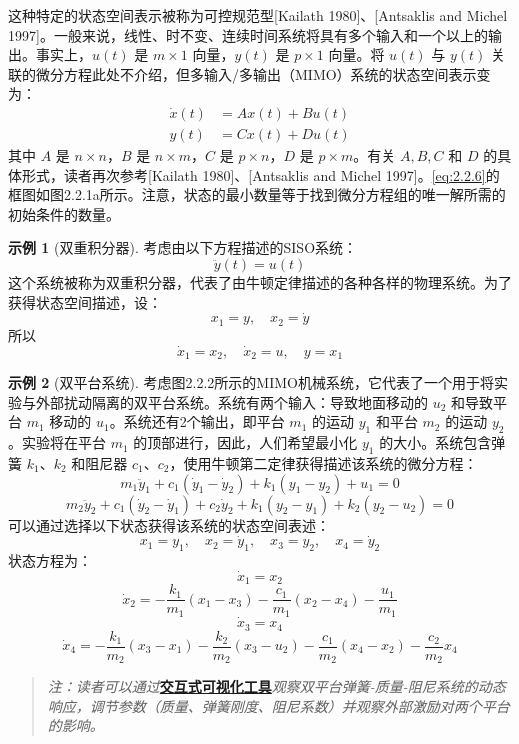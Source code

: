 \documentclass[UTF8,12pt,a4paper]{ctexart}
\theoremstyle{definition}
\newtheorem{example}{示例}[section]
\begin{document}
这种特定的状态空间表示被称为可控规范型[Kailath 1980]、[Antsaklis and Michel 1997]。一般来说，线性、时不变、连续时间系统将具有多个输入和一个以上的输出。事实上，$u(t)$ 是 $m \times 1$ 向量，$y(t)$ 是 $p \times 1$ 向量。将 $u(t)$ 与 $y(t)$ 关联的微分方程此处不介绍，但多输入/多输出（MIMO）系统的状态空间表示变为：
\begin{equation}\label{eq:2.2.6}
\begin{aligned}
\dot{x}(t) &= Ax(t) + Bu(t) \\
y(t) &= Cx(t) + Du(t)
\end{aligned}
\end{equation}
其中 $A$ 是 $n \times n$，$B$ 是 $n \times m$，$C$ 是 $p \times n$，$D$ 是 $p \times m$。有关 $A, B, C$ 和 $D$ 的具体形式，读者再次参考[Kailath 1980]、[Antsaklis and Michel 1997]。\eqref{eq:2.2.6}的框图如图2.2.1a所示。注意，状态的最小数量等于找到微分方程组的唯一解所需的初始条件的数量。

\begin{example}[双重积分器]
考虑由以下方程描述的SISO系统：
\[
\ddot{y}(t) = u(t)
\]
这个系统被称为双重积分器，代表了由牛顿定律描述的各种各样的物理系统。为了获得状态空间描述，设：
\[
x_1 = y, \quad x_2 = \dot{y}
\]
所以
\[
\dot{x}_1 = x_2, \quad \dot{x}_2 = u, \quad y = x_1
\]
\end{example}

\begin{example}[双平台系统]
考虑图2.2.2所示的MIMO机械系统，它代表了一个用于将实验与外部扰动隔离的双平台系统。系统有两个输入：导致地面移动的 $u_2$ 和导致平台 $m_1$ 移动的 $u_1$。系统还有2个输出，即平台 $m_1$ 的运动 $y_1$ 和平台 $m_2$ 的运动 $y_2$。实验将在平台 $m_1$ 的顶部进行，因此，人们希望最小化 $y_1$ 的大小。系统包含弹簧 $k_1$、$k_2$ 和阻尼器 $c_1$、$c_2$，使用牛顿第二定律获得描述该系统的微分方程：
\[
m_1 \ddot{y}_1 + c_1(\dot{y}_1 - \dot{y}_2) + k_1(y_1 - y_2) + u_1 = 0
\]
\[
m_2 \ddot{y}_2 + c_1(\dot{y}_2 - \dot{y}_1) + c_2\dot{y}_2 + k_1(y_2 - y_1) + k_2(y_2 - u_2) = 0
\]
可以通过选择以下状态获得该系统的状态空间表述：
\[
x_1 = y_1, \quad x_2 = \dot{y}_1, \quad x_3 = y_2, \quad x_4 = \dot{y}_2
\]
状态方程为：
\[
\dot{x}_1 = x_2
\]
\[
\dot{x}_2 = -\frac{k_1}{m_1}(x_1 - x_3) - \frac{c_1}{m_1}(x_2 - x_4) - \frac{u_1}{m_1}
\]
\[
\dot{x}_3 = x_4
\]
\[
\dot{x}_4 = -\frac{k_1}{m_2}(x_3 - x_1) - \frac{k_2}{m_2}(x_3 - u_2) - \frac{c_1}{m_2}(x_4 - x_2) - \frac{c_2}{m_2}x_4
\]
\end{example}

\begin{quote}
\textit{注：读者可以通过}\href{https://frankjie09.github.io/Robot-Manipulator-Control-CN/figures/Two_Platform_System.html}{\textbf{交互式可视化工具}}\textit{观察双平台弹簧-质量-阻尼系统的动态响应，调节参数（质量、弹簧刚度、阻尼系数）并观察外部激励对两个平台的影响。}
\end{quote}
\end{document}
